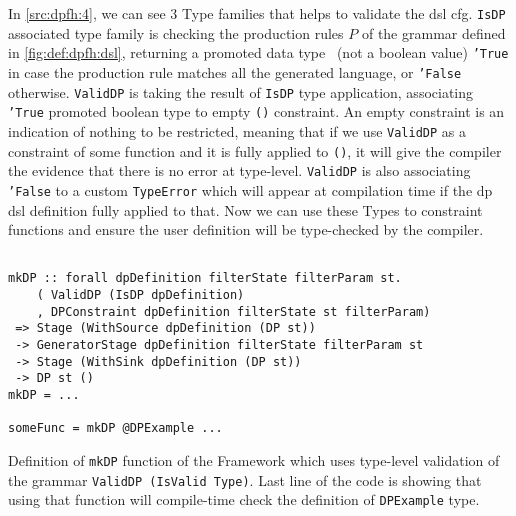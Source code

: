 In \autoref{src:dpfh:4}, we can see 3 Type families that helps to validate the \acrshort{dsl} \acrshort{cfg}. 
\texttt{IsDP} associated type family is checking the production rules $P$ of the grammar defined in \autoref{fig:def:dpfh:dsl}, returning a promoted data type~\cite{promoted-types} (not a boolean value) \texttt{'True} in case
the production rule matches all the generated language, or \texttt{'False} otherwise. 
\texttt{ValidDP} is taking the result of \texttt{IsDP} type application, associating \texttt{'True} promoted boolean type to empty \texttt{()} constraint. An empty constraint is an 
indication of nothing to be restricted, meaning that if we use \texttt{ValidDP} as a constraint of some function and it is fully applied to \texttt{()}, it will give the compiler the evidence that there is no error at type-level.
\texttt{ValidDP} is also associating \texttt{'False} to a custom \texttt{TypeError} which will appear at compilation time if the \acrshort{dp} \acrshort{dsl} definition fully applied to that.
Now we can use these Types to constraint functions and ensure the user definition will be type-checked by the compiler.

\begin{listing}[htp!]
  \begin{verbatim}

mkDP :: forall dpDefinition filterState filterParam st.
    ( ValidDP (IsDP dpDefinition)
    , DPConstraint dpDefinition filterState st filterParam)
 => Stage (WithSource dpDefinition (DP st)) 
 -> GeneratorStage dpDefinition filterState filterParam st  
 -> Stage (WithSink dpDefinition (DP st))  
 -> DP st ()
mkDP = ...

someFunc = mkDP @DPExample ...

  \end{verbatim}
  \caption[{[\texttt{Stage.hs}] Using validation of \acrshort{dp} encoded in $G_{dsl}$}]{Definition of \texttt{mkDP} function of the Framework which uses type-level validation of the grammar \texttt{ValidDP (IsValid Type)}. Last line of the code is showing that using that function will compile-time check the definition of \texttt{DPExample} type.}
  \label{src:dpfh:5}
\end{listing}

